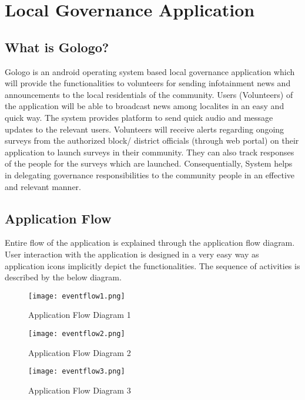 \chapter {Local Governance Application}

\section{What is Gologo?}

Gologo is an android operating system based local governance application which will provide the functionalities to volunteers for sending infotainment news and announcements to the local residentials of the community. Users (Volunteers) of the application will be able to broadcast news among localites in an easy and quick way.  The system provides platform to send quick audio and message updates to the relevant users. Volunteers will receive alerts regarding ongoing surveys from the authorized block/ district officials (through web portal)  on their application to launch surveys in their community. They can also track responses of the people for the surveys which are launched. Consequentially, System helps in delegating governance responsibilities to the community people in an effective and relevant manner.

\section{ Application Flow}
 Entire flow of the application is explained through the application flow diagram. User interaction with the application is designed in a  very easy way as application icons implicitly depict the functionalities. The sequence of activities is described by the below diagram.

\begin{figure}[H]
    \centering
	\texttt{[image: eventflow1.png]}
    \caption{ Application Flow Diagram 1}
    \label{fig:Application Flow Diagram 1}
\end{figure} 

\begin{figure}[H]
    \centering
	\texttt{[image: eventflow2.png]}
    \caption{ Application Flow Diagram 2}
    \label{fig:Application Flow Diagram 2}
\end{figure} 

\begin{figure}[H]
    \centering
	\texttt{[image: eventflow3.png]}
    \caption{ Application Flow Diagram 3}
    \label{fig:Application Flow Diagram 3}
\end{figure} 

